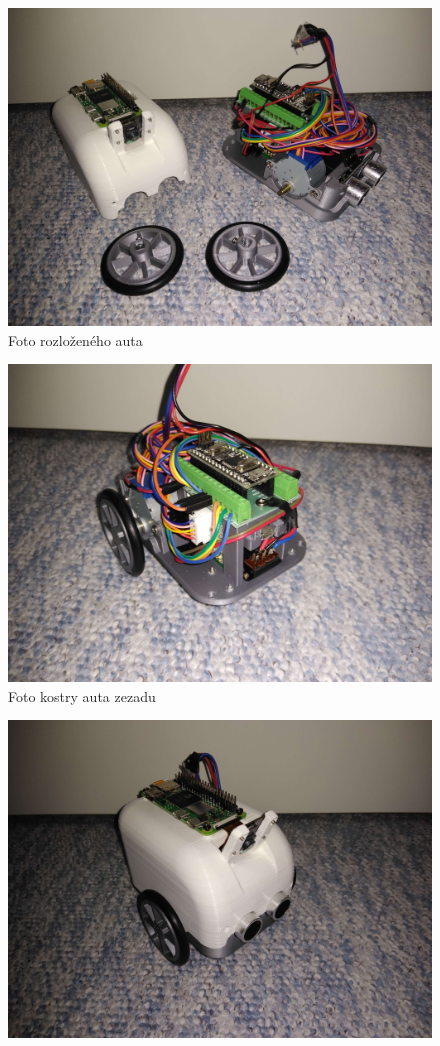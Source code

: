 \documentclass[12pt]{article}
\begin{document}
\begin{spacing}{1.5}
	\begin{figure}[H]
		\centering
		\includegraphics[width=360pt]{real_rozlozeno}
		\caption{Foto rozloženého auta}
		\label{fig:real_rozlozeno}
	\end{figure}
	\begin{figure}[H]
		\centering
		\includegraphics[width=360pt]{real_kostra_zadek}
		\caption{Foto kostry auta zezadu}
		\label{fig:real_kostra_zadek}
	\end{figure}
	\begin{figure}[H]
		\centering
		\includegraphics[width=360pt]{real_vse}

\end{figure}
\end{spacing}
\end{document}
